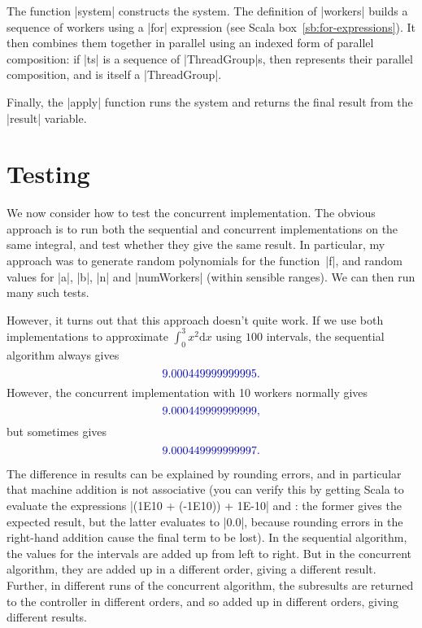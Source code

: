 The function |system| constructs the system.  The definition of |workers|
builds a sequence of workers using a |for| expression (see Scala
box~\ref{sb:for-expressions}).  It then combines them together in parallel
using an indexed form of parallel composition: if |ts| is a sequence of
|ThreadGroup|s, then  represents their parallel composition,
and is itself a |ThreadGroup|.

Finally, the |apply| function runs the system and returns the final result
from the |result| variable. 


\section{Testing}

We now consider how to test the concurrent implementation.  The obvious
approach is to run both the sequential and concurrent implementations on the
same integral, and test whether they give the same result.  In particular, my
approach was to generate random polynomials for the function~|f|,
and random values for |a|, |b|, |n| and |numWorkers| (within sensible ranges).
We can then run many such tests.

However, it turns out that this approach doesn't quite work.  If we use both
implementations to approximate $\int_0^3 x^2 \mbox{d}x$ using $100$ intervals,
the sequential algorithm always gives
\[\mstyle
  9.000449999999995.
\]
However,  the concurrent implementation with 10 workers normally gives
\[\mstyle
  9.000449999999999,
\]
but sometimes gives
\[\mstyle
  9.000449999999997.
\]


The difference in results can be explained by rounding errors, and in
particular that machine addition is not associative (you can verify this by
getting Scala to evaluate the expressions |(1E10 + (-1E10)) + 1E-10| and
: the former gives the expected result, but the
latter evaluates to |0.0|, because rounding errors in the right-hand addition
cause the final term to be lost).
%
In the sequential algorithm, the values for the intervals are added up from
left to right.  But in the concurrent algorithm, they are added up in a
different order, giving a different result.  Further, in different runs of the
concurrent algorithm, the subresults are returned to the controller in
different orders, and so added up in different orders, giving different
results.

